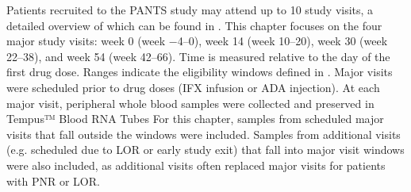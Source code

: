 \begin{outline}
%
%
%
Patients recruited to the \gls{PANTS} study may attend up to 10 study visits, a detailed overview of which can be found in \textcite{kennedy2019PredictorsAntiTNFTreatment}. 
This chapter focuses on the four major study visits: week 0 (week \numrange{-4}{0}), week 14 (week \numrange{10}{20}), week 30 (week \numrange{22}{38}), and week 54 (week \numrange{42}{66}).
Time is measured relative to the day of the first drug dose.
Ranges indicate the eligibility windows defined in \textcite{kennedy2019PredictorsAntiTNFTreatment}.
Major visits were scheduled prior to drug doses (IFX infusion or ADA injection).
At each major visit, peripheral whole blood samples were collected and preserved in Tempus™ Blood RNA Tubes
For this chapter, samples from scheduled major visits that fall outside the windows were included.
Samples from additional visits (e.g. scheduled due to \gls{LOR} or early study exit) that fall into major visit windows were also included, as additional visits often replaced major visits for patients with \gls{PNR} or \gls{LOR}.




\end{outline}
